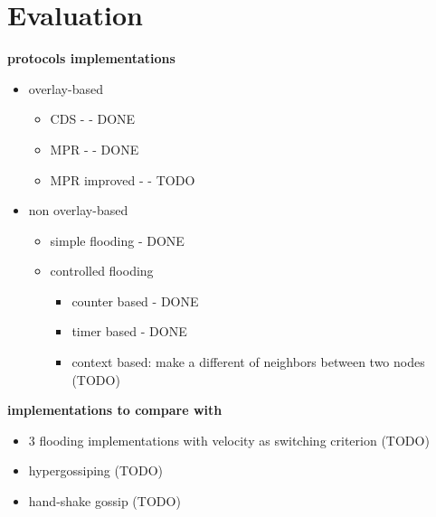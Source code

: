 
\section{Evaluation}
\label{sec:evaluation}
\textbf{protocols implementations}
\begin{itemize}
	\item overlay-based
	\begin{itemize}
		\item CDS - \cite{stojmenovic-cds} - DONE
		\item MPR - \cite{mpr} - DONE
		\item MPR improved - \cite{mpr-improvement} - TODO
	\end{itemize}
		\item non overlay-based
	\begin{itemize}
		\item simple flooding - DONE
		\item controlled flooding
		\begin{itemize}
			\item counter based - DONE
			\item timer based - DONE
			\item context based: make a different of neighbors between two nodes (TODO)
		\end{itemize}
	\end{itemize}
\end{itemize}


\textbf{implementations to compare with}
\begin{itemize}
	\item 3 flooding implementations with velocity as switching criterion \cite{2001:AAR:876878.879323} (TODO)
	\item hypergossiping \cite{hypergossiping} (TODO)
	\item hand-shake gossip \cite{adaptive-multihop} (TODO)
\end{itemize}

